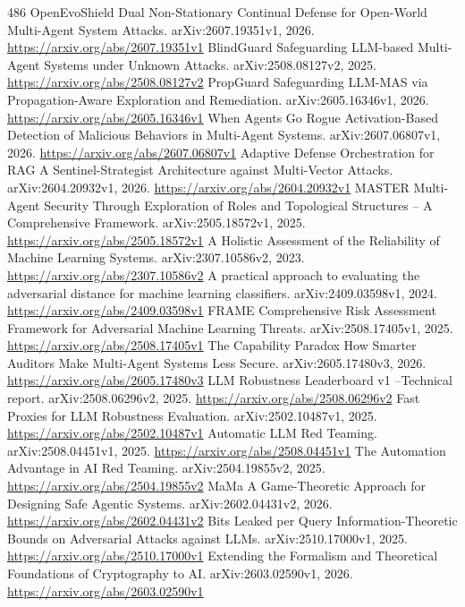 \documentclass[11pt]{article}
\begin{document}
\begin{thebibliography}{486}
 OpenEvoShield Dual Non-Stationary Continual Defense for Open-World Multi-Agent System Attacks. arXiv:2607.19351v1, 2026. \url{https://arxiv.org/abs/2607.19351v1}
 BlindGuard Safeguarding LLM-based Multi-Agent Systems under Unknown Attacks. arXiv:2508.08127v2, 2025. \url{https://arxiv.org/abs/2508.08127v2}
 PropGuard Safeguarding LLM-MAS via Propagation-Aware Exploration and Remediation. arXiv:2605.16346v1, 2026. \url{https://arxiv.org/abs/2605.16346v1}
 When Agents Go Rogue Activation-Based Detection of Malicious Behaviors in Multi-Agent Systems. arXiv:2607.06807v1, 2026. \url{https://arxiv.org/abs/2607.06807v1}
 Adaptive Defense Orchestration for RAG A Sentinel-Strategist Architecture against Multi-Vector Attacks. arXiv:2604.20932v1, 2026. \url{https://arxiv.org/abs/2604.20932v1}
 MASTER Multi-Agent Security Through Exploration of Roles and Topological Structures -- A Comprehensive Framework. arXiv:2505.18572v1, 2025. \url{https://arxiv.org/abs/2505.18572v1}
 A Holistic Assessment of the Reliability of Machine Learning Systems. arXiv:2307.10586v2, 2023. \url{https://arxiv.org/abs/2307.10586v2}
 A practical approach to evaluating the adversarial distance for machine learning classifiers. arXiv:2409.03598v1, 2024. \url{https://arxiv.org/abs/2409.03598v1}
 FRAME Comprehensive Risk Assessment Framework for Adversarial Machine Learning Threats. arXiv:2508.17405v1, 2025. \url{https://arxiv.org/abs/2508.17405v1}
 The Capability Paradox How Smarter Auditors Make Multi-Agent Systems Less Secure. arXiv:2605.17480v3, 2026. \url{https://arxiv.org/abs/2605.17480v3}
 LLM Robustness Leaderboard v1 --Technical report. arXiv:2508.06296v2, 2025. \url{https://arxiv.org/abs/2508.06296v2}
 Fast Proxies for LLM Robustness Evaluation. arXiv:2502.10487v1, 2025. \url{https://arxiv.org/abs/2502.10487v1}
 Automatic LLM Red Teaming. arXiv:2508.04451v1, 2025. \url{https://arxiv.org/abs/2508.04451v1}
 The Automation Advantage in AI Red Teaming. arXiv:2504.19855v2, 2025. \url{https://arxiv.org/abs/2504.19855v2}
 MaMa A Game-Theoretic Approach for Designing Safe Agentic Systems. arXiv:2602.04431v2, 2026. \url{https://arxiv.org/abs/2602.04431v2}
 Bits Leaked per Query Information-Theoretic Bounds on Adversarial Attacks against LLMs. arXiv:2510.17000v1, 2025. \url{https://arxiv.org/abs/2510.17000v1}
 Extending the Formalism and Theoretical Foundations of Cryptography to AI. arXiv:2603.02590v1, 2026. \url{https://arxiv.org/abs/2603.02590v1}

\end{thebibliography}
\end{document}
